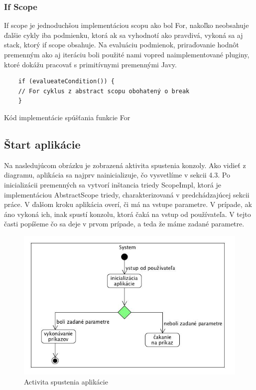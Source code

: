 {\subsubsection{If Scope}
\indent If scope je jednoduchšou implementáciou scopu ako bol For, nakoľko neobsahuje ďalšie cykly iba podmienku, ktorá ak sa vyhodnotí ako pravdivá, vykoná sa aj stack, ktorý if scope obsahuje. Na evaluáciu podmienok, priraďovanie hodnôt premenným ako aj iteráciu boli použité nami vopred naimplementované pluginy, ktoré dokážu pracovať s primitívnymi premennými Javy. 
\begin{algorithm}[H]
	\begin{verbatim}
	if (evalueateCondition()) {
	// For cyklus z abstract scopu obohatený o break
	}
	\end{verbatim}
	\caption{Kód implementácie spúšťania funkcie For}
	\label{alg:gen}
\end{algorithm}
\subsection{Štart aplikácie}
\indent  Na nasledujúcom obrázku je zobrazená aktivita spustenia konzoly. Ako vidieť z diagramu, aplikácia sa najprv nainicializuje, čo vysvetlíme v sekcii 4.3. Po inicializácii premenných sa vytvorí inštancia triedy ScopeImpl, ktorá je implementáciou AbstractScope triedy, charakterizovaná v predchádzajúcej sekcii práce. V ďalšom kroku aplikácia overí, či má na vstupe parametre. V prípade, ak áno vykoná ich, inak spustí konzolu, ktorá čaká na vstup od používateľa. V tejto časti popíšeme čo sa deje v prvom prípade, a teda že máme zadané parametre. 
\begin{figure}[H]
	\centering
	\includegraphics[width=13cm]{img/System.jpg}
	\caption{Activita spustenia aplikácie}
	\label{fig:test}
\end{figure}
}
